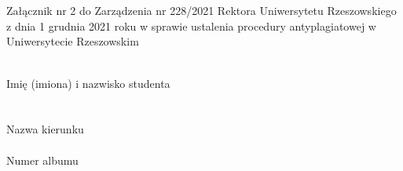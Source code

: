 \chapter*{}

\makeatletter
{}

\noindent
\begin{flushright}
    \begin{minipage}[!h]{10cm}
        Załącznik nr 2 do Zarządzenia nr 228/2021 Rektora Uniwersytetu Rzeszowskiego z dnia 1 grudnia 2021 roku w sprawie ustalenia procedury antyplagiatowej w Uniwersytecie Rzeszowskim
    \end{minipage}
\end{flushright}

\begin{center}
    \vspace*{10mm}
    \vspace*{10mm}
\end{center}

\noindent
\dotuline{\hspace{1.3cm}\@author\hspace{1.3cm}}\\ %
{\small Imię (imiona) i nazwisko studenta }\\

\noindent \@faculty\\

\noindent \dotuline{\hspace{1.4cm}\@degreeprogramme \hspace{1.4cm}}\\
{\small Nazwa kierunku} \\

\noindent \dotuline{\hspace{1.8cm}\@noAlbum\hspace{1.9cm}}\\
{\small Numer albumu}

